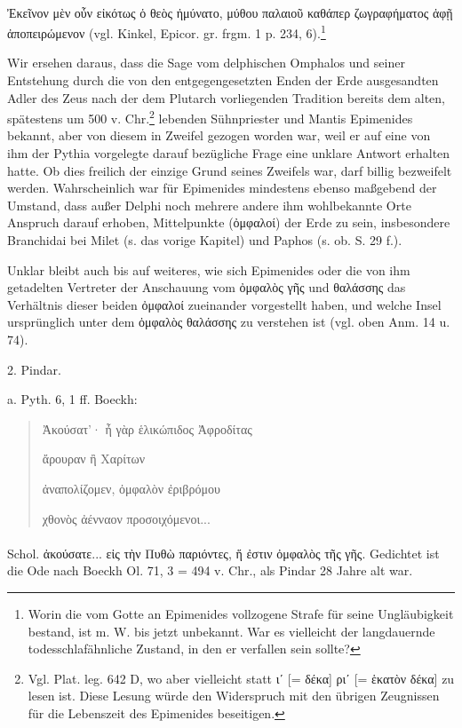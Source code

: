 \documentclass[a4paper, 11pt, oneside]{article}
\begin{document}
\paragraph{}
Ἐκεῖνον μὲν οὖν εἰκότως ὁ θεὸς ἠμύνατο, μύθου παλαιοῦ καθάπερ ζωγραφήματος ἁφῇ ἀποπειρώμενον (vgl. Kinkel, Epicor. gr. frgm. 1 p. 234, 6).\footnote{Worin die vom Gotte an Epimenides vollzogene Strafe für seine Ungläubigkeit bestand, ist m. W. bis jetzt unbekannt. War es vielleicht der langdauernde todesschlafähnliche Zustand, in den er verfallen sein sollte?}

Wir ersehen daraus, dass die Sage vom delphischen Omphalos und seiner Entstehung durch die von den entgegengesetzten Enden der Erde ausgesandten Adler des Zeus nach der dem Plutarch vorliegenden Tradition bereits dem alten, spätestens um 500 v. Chr.\footnote{Vgl. Plat. leg. 642 D, wo aber vielleicht statt ιʹ [= δέκα] ριʹ [= ἑκατὸν δέκα] zu lesen ist. Diese Lesung würde den Widerspruch mit den übrigen Zeugnissen für die Lebenszeit des Epimenides beseitigen.} lebenden Sühnpriester und Mantis Epimenides bekannt, aber von diesem in Zweifel gezogen worden war, weil er auf eine von ihm der Pythia vorgelegte darauf bezügliche Frage eine unklare Antwort erhalten hatte. Ob dies freilich der einzige Grund seines Zweifels war, darf billig bezweifelt werden. Wahrscheinlich war für Epimenides mindestens ebenso maßgebend der Umstand, dass außer Delphi noch mehrere andere ihm wohlbekannte Orte Anspruch darauf erhoben, Mittelpunkte (ὀμφαλοί) der Erde zu sein, insbesondere Branchidai bei Milet (s. das vorige Kapitel) und Paphos (s. ob. S. 29 f.).

Unklar bleibt auch bis auf weiteres, wie sich Epimenides oder die von ihm getadelten Vertreter der Anschauung vom ὀμφαλὸς γῆς und θαλάσσης das Verhältnis dieser beiden ὀμφαλοί zueinander vorgestellt haben, und welche Insel ursprünglich unter dem ὀμφαλὸς θαλάσσης zu verstehen ist (vgl. oben Anm. 14 u. 74).

2. Pindar.

a. Pyth. 6, 1 ff. Boeckh:
\begin{quotation}
Ἀκούσατ'· ἦ γὰρ ἑλικώπιδος Ἀφροδίτας

ἄρουραν ἢ Χαρίτων

ἀναπολίζομεν, ὀμφαλὸν ἐριβρόμου

χθονὸς ἀένναον προσοιχόμενοι...
\end{quotation}
\paragraph{}
Schol. ἀκούσατε... εἰς τὴν Πυθὼ παριόντες, ἥ ἐστιν ὀμφαλὸς τῆς γῆς. Gedichtet ist die Ode nach Boeckh Ol. 71, 3 = 494 v. Chr., als Pindar 28 Jahre alt war.
\end{document}
